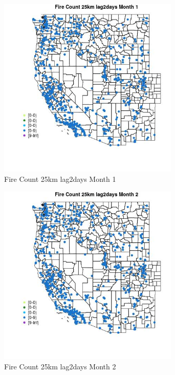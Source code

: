 \begin{figure} 
\centering  
\includegraphics[width=0.77\textwidth]{Code_Outputs/Report_ML_input_PM25_Step4_part_e_de_duplicated_aves_compiled_2019-05-21wNAs_MapObsMo1Fire_Count_25km_lag2days.jpg} 
\caption{\label{fig:Report_ML_input_PM25_Step4_part_e_de_duplicated_aves_compiled_2019-05-21wNAsMapObsMo1Fire_Count_25km_lag2days}Fire Count 25km lag2days Month 1} 
\end{figure} 
 

\clearpage 

\begin{figure} 
\centering  
\includegraphics[width=0.77\textwidth]{Code_Outputs/Report_ML_input_PM25_Step4_part_e_de_duplicated_aves_compiled_2019-05-21wNAs_MapObsMo2Fire_Count_25km_lag2days.jpg} 
\caption{\label{fig:Report_ML_input_PM25_Step4_part_e_de_duplicated_aves_compiled_2019-05-21wNAsMapObsMo2Fire_Count_25km_lag2days}Fire Count 25km lag2days Month 2} 
\end{figure} 
 

